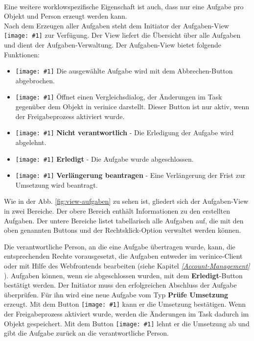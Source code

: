 \documentclass[a4paper,10pt]{book}
\newcommand{\icon}[1]{\texttt{[image: \#1]}}
\begin{document}
\newline\\
Eine weitere worklowspezifische Eigenschaft ist auch, dass nur eine Aufgabe pro Objekt und Person erzeugt werden kann.
\newline\\
Nach dem Erzeugen aller Aufgaben steht dem Initiator der Aufgaben-View \icon{Icon/Tasks.png} zur Verfügung. Der View liefert die Übersicht über alle Aufgaben und dient der Aufgaben-Verwaltung.  Der Aufgaben-View bietet folgende Funktionen:
\begin{itemize}
\item \icon{Icon/Nein.png} Die ausgewählte
  Aufgabe wird mit dem Abbrechen-Button abgebrochen.
\item \icon{Icon/history_rep.png} Öffnet einen
  Vergleichsdialog, der Änderungen im Task gegenüber dem Objekt in
  verinice darstellt. Dieser Button ist nur aktiv, wenn der
  Freigabeprozess aktiviert wurde.
  \item \icon{Icon/16-em-check.png} \textbf{Nicht verantwortlich} - Die Erledigung der Aufgabe wird abgelehnt.
  \item \icon{Icon/16-em-check.png} \textbf{Erledigt} - Die Aufgabe wurde abgeschlossen.
  \item \icon{Icon/16-em-check.png} \textbf{Verlängerung beantragen} - Eine Verlängerung der Frist zur Umsetzung wird beantragt.
\end{itemize}
Wie in der Abb. \ref{fig:view-aufgaben} zu sehen ist, gliedert sich der Aufgaben-View in zwei Bereiche. Der obere Bereich enthält Informationen zu den erstellten Aufgaben. Der untere Bereiche listet tabellarisch alle Aufgaben auf, die mit den oben genannten Buttons und der Rechtsklick-Option verwaltet werden können.

Die verantwortliche Person, an die eine Aufgabe übertragen wurde, kann, die entsprechenden Rechte vorausgesetzt, die Aufgaben entweder im verinice-Client oder mit Hilfe des Webfrontends bearbeiten (siehe Kapitel {\em \ref{Account-Management} }). Aufgaben können, wenn sie abgeschlossen wurden, mit dem \textbf{Erledigt}-Button bestätigt werden. Der Initiator muss den erfolgreichen Abschluss der Aufgabe
überprüfen. Für ihn wird eine neue Aufgabe vom Typ \textbf{Prüfe Umsetzung} erzeugt. Mit dem Button \icon{Icon/Akzeptieren.png} kann er die Umsetzung bestätigen. Wenn der Freigabeprozess aktiviert wurde, werden die Änderungen im Task dadurch im Objekt gespeichert. Mit dem Button \icon{Icon/Zurueckweisen.png} lehnt er die Umsetzung ab und gibt die Aufgabe zurück an die verantwortliche Person.
\end{document}
